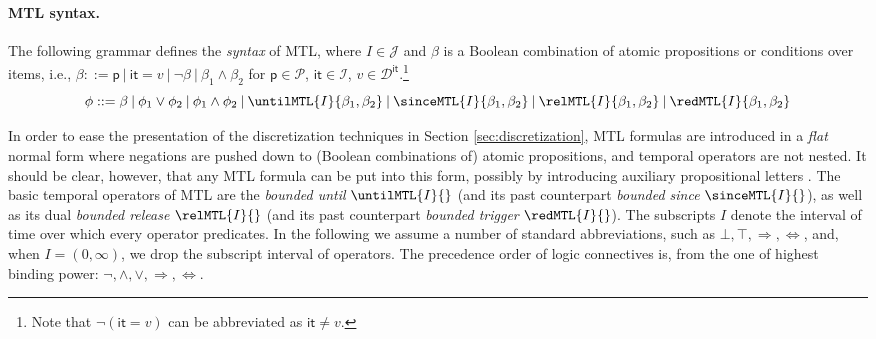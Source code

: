 \documentclass[a4paper]{article}
\newcommand{\pp}{\mathsf{p}}
\newcommand{\logictrue}{\top}
\newcommand{\logicfalse}{\bot}
\newcommand{\Ical}{\mathcal{I}}
\newcommand{\Jcal}{\mathcal{J}}
\newcommand{\Pcal}{\mathcal{P}}
\newcommand{\Dcal}{\mathcal{D}}
\newcommand{\iit}{\mathsf{it}}
\theoremstyle{plain}
\theoremstyle{definition}
\begin{document}
\paragraph{MTL syntax.}
The following grammar defines the \emph{syntax} of MTL, where $I \in \Jcal$ and $\beta$ is a Boolean combination of atomic propositions or conditions over items, i.e., $\beta  ::= \pp \:|\: \iit = v \:|\: \neg \beta  \:|\:  \beta_1 \wedge \beta_2$ for $\pp \in \Pcal$, $\iit \in \Ical$, $v \in \Dcal^{\iit}$.\footnote{Note that $\neg (\iit = v)$ can be abbreviated as $\iit \neq v$.}
\begin{equation*}
  \phi  ::=  \beta \:|\: \phi_1 \vee \phi_2  \:|\: \phi_1 \wedge \phi_2  \:|\:
                   \untilMTL{I}{\beta_1, \beta_2}  \:|\: \sinceMTL{I}{\beta_1, \beta_2} \:|\:
                              \relMTL{I}{\beta_1, \beta_2}  \:|\: \redMTL{I}{\beta_1, \beta_2}
\end{equation*}

In order to ease the presentation of the discretization techniques in Section \ref{sec:discretization}, MTL formulas are introduced in a \emph{flat} normal form where negations are pushed down to (Boolean combinations of) atomic propositions, and temporal operators are not nested.
It should be clear, however, that any MTL formula can be put into this form, possibly by introducing auxiliary propositional letters \cite{DMP06,Fur07}.
The basic temporal operators of MTL are the \emph{bounded until} $\untilMTL{I}{}$ (and its past counterpart \emph{bounded since} $\sinceMTL{I}{}$), as well as its dual \emph{bounded release} $\relMTL{I}{}$ (and its past counterpart \emph{bounded trigger} $\redMTL{I}{}$).
The subscripts $I$ denote the interval of time over which every operator predicates.
In the following we assume a number of standard abbreviations, such as $\logicfalse, \logictrue, \Rightarrow, \Leftrightarrow$, and, when $I = (0, \infty)$, we drop the subscript interval of operators.
The precedence order of logic connectives is, from the one of highest binding power: $\neg, \wedge, \vee, \Rightarrow, \Leftrightarrow$.
\end{document}
